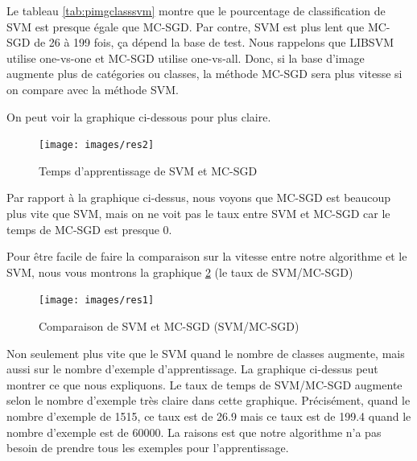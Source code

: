 Le tableau \ref{tab:pimgclasssvm} montre que le pourcentage de classification de SVM est presque égale que MC-SGD. Par contre, SVM est plus lent que MC-SGD de 26 à 199 fois, ça dépend la base de test. Nous rappelons que LIBSVM utilise one-vs-one et MC-SGD utilise one-vs-all. Donc, si la base d'image augmente plus de catégories ou classes, la méthode MC-SGD sera plus vitesse si on compare avec la méthode SVM.

\pagebreak
On peut voir la graphique ci-dessous pour plus claire.
\begin{figure}[H]
\centering
\texttt{[image: images/res2]}
\caption{Temps d'apprentissage de SVM et MC-SGD}
\label{fig:res}
\end{figure}
Par rapport à la graphique ci-dessus, nous voyons que MC-SGD est beaucoup plus vite que SVM, mais on ne voit pas le taux entre SVM et MC-SGD car le temps de MC-SGD est presque 0.

\pagebreak
Pour être facile de faire la comparaison sur la vitesse entre notre algorithme et le SVM, nous vous montrons la graphique \ref{fig:res1} (le taux de SVM/MC-SGD)
\begin{figure}[H]
\centering
\texttt{[image: images/res1]}
\caption{Comparaison de SVM et MC-SGD (SVM/MC-SGD)}
\label{fig:res1}
\end{figure}

Non seulement plus vite que le SVM quand le nombre de classes augmente, mais aussi sur le nombre d'exemple d'apprentissage. La graphique ci-dessus peut montrer ce que nous expliquons. Le taux de temps de SVM/MC-SGD augmente selon le nombre d'exemple très claire dans cette graphique. Précisément, quand le nombre d'exemple de 1515, ce taux est de 26.9 mais ce taux est de 199.4 quand le nombre d'exemple est de 60000. La raisons est que notre algorithme n'a pas besoin de prendre tous les exemples pour l'apprentissage.
